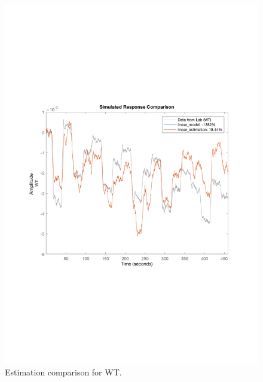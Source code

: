 \begin{figure}
 \centering
\includegraphics[scale=0.45]{report/pictures/WT_estimation.pdf}
    \caption{Estimation comparison for WT.}
\end{figure}
